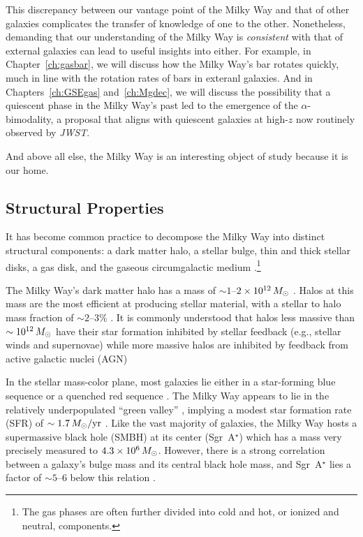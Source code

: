 This discrepancy between our vantage point of the Milky Way and that of other galaxies complicates the transfer of knowledge of one to the other. Nonetheless, demanding that our understanding of the Milky Way is \textit{consistent} with that of external galaxies can lead to useful insights into either. For example, in Chapter~\ref{ch:gasbar}, we will discuss how the Milky Way's bar rotates quickly, much in line with the rotation rates of bars in exteranl galaxies. And in Chapters~\ref{ch:GSEgas} and~\ref{ch:Mgdec}, we will discuss the possibility that a quiescent phase in the Milky Way's past led to the emergence of the $\alpha$-bimodality, a proposal that aligns with quiescent galaxies at high-$z$ now routinely observed by \textit{JWST}.

And above all else, the Milky Way is an interesting object of study because it is our home.

\subsection{Structural Properties}\label{intro:ssec:struct_prop}
It has become common practice to decompose the Milky Way into distinct structural components: a dark matter halo, a stellar bulge, thin and thick stellar disks, a gas disk, and the gaseous circumgalactic medium \citep[for an extensive review, see][]{2016ARA&A..54..529B}.\footnote{The gas phases are often further divided into cold and hot, or ionized and neutral, components.}

The Milky Way's dark matter halo has a mass of $\sim1$--$2\times10^{12}\,M_{\odot}$ \citep[Table 8 in][]{2016ARA&A..54..529B}. Halos at this mass are the most efficient at producing stellar material, with a stellar to halo mass fraction of $\sim2$--$3\%$ \citep{2013ApJ...770...57B}. It is commonly understood that halos less massive than $\sim10^{12}\,M_{\odot}$ have their star formation inhibited by stellar feedback (e.g., stellar winds and supernovae) while more massive halos are inhibited by feedback from active galactic nuclei (AGN) 

In the stellar mass-color plane, most galaxies lie either in a star-forming blue sequence or a quenched red sequence \citep{2006MNRAS.373..469B}. The Milky Way appears to lie in the relatively underpopulated ``green valley'' \citep{2011ApJ...736...84M}, implying a modest star formation rate (SFR) of $\sim1.7\,M_{\odot}/\textrm{yr}$ \citep{2015ApJ...806...96L}. Like the vast majority of galaxies, the Milky Way hosts a supermassive black hole (SMBH) at its center (Sgr~A$^{\star}$) which has a mass very precisely measured to $4.3\times10^{6}\,M_{\odot}$. However, there is a strong correlation between a galaxy's bulge mass and its central black hole mass, and Sgr~A$^{\star}$ lies a factor of $\sim5$--$6$ below this relation \citep{2013ARA&A..51..511K}.

